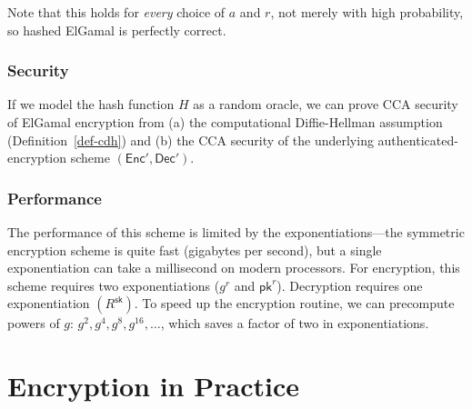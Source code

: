 \documentclass[
  letterpaper,
]{scrbook}
\newcommand{\Enc}{\mathsf{Enc}}
\newcommand{\Dec}{\mathsf{Dec}}
\newcommand{\sk}{\mathsf{sk}}
\newcommand{\pk}{\mathsf{pk}}
\theoremstyle{definition}
\theoremstyle{plain}
\theoremstyle{plain}
\theoremstyle{remark}
\begin{document}
Note that this holds for \emph{every} choice of \(a\) and \(r\), not
merely with high probability, so hashed ElGamal is perfectly correct.


\subsection{Security}\label{security}

If we model the hash function \(H\) as a random oracle, we can prove CCA
security of ElGamal encryption from (a) the computational Diffie-Hellman
assumption (Definition~\ref{def-cdh}) and (b) the CCA security of the
underlying authenticated-encryption scheme \((\Enc', \Dec')\).

\subsection{Performance}\label{performance}

The performance of this scheme is limited by the exponentiations---the
symmetric encryption scheme is quite fast (gigabytes per second), but a
single exponentiation can take a millisecond on modern processors. For
encryption, this scheme requires two exponentiations (\(g^r\) and
\(\pk^r\)). Decryption requires one exponentiation \((R^\sk)\). To speed
up the encryption routine, we can precompute powers of \(g\):
\(g^2, g^4, g^8, g^{16}, \dots\), which saves a factor of two in
exponentiations.


\chapter{Encryption in Practice}\label{encryption-in-practice}
\end{document}
